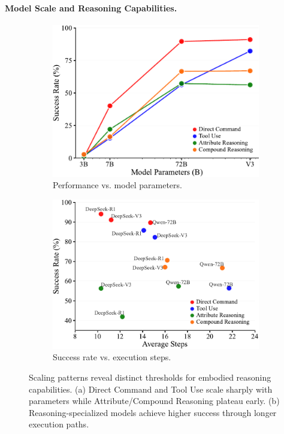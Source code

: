 \paragraph{Model Scale and Reasoning Capabilities.}
\begin{figure}[t]
    \centering
    \begin{subfigure}[b]{0.48\textwidth}
        \centering
        \includegraphics[width=\textwidth,clip]{figures/exp_2_parameter_scaling.pdf}
        \caption{Performance vs. model parameters.}
        \label{fig:parameter-scaling}
    \end{subfigure}
    \hfill
    \begin{subfigure}[b]{0.48\textwidth}
        \centering
        \includegraphics[width=\textwidth,clip]{figures/exp_2_step_efficiency.pdf}
        \caption{Success rate vs. execution steps.}
        \label{fig:step-efficiency}
    \end{subfigure}
    \caption{Scaling patterns reveal distinct thresholds for embodied reasoning capabilities. (a) Direct Command and Tool Use scale sharply with parameters while Attribute/Compound Reasoning plateau early. (b) Reasoning-specialized models achieve higher success through longer execution paths.}
    \label{fig:scaling-efficiency-analysis}
\end{figure}
